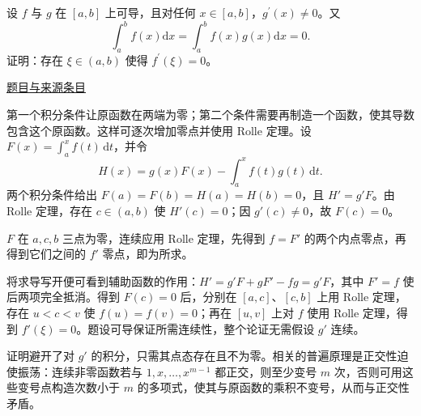 \documentclass[UTF8,12pt,a4paper,fontset=fandol]{ctexart}
\begin{document}
\begin{example}[来源序号5]\label{ex:ch06-14th-A-makeup2:5}\label{pr:ch06-14th-A-makeup2:5}

设 $f$ 与 $g$ 在 $[a,b]$ 上可导，且对任何 $x\in[a,b]$，$g^{\prime}(x)\neq 0$。又
\[
\int_{a}^{b}f(x)\mathrm{d}x=\int_{a}^{b}f(x)g(x)\mathrm{d}x=0.
\]
证明：存在 $\xi\in(a,b)$ 使得 $f^{\prime}(\xi)=0$。

\par\href{https://github.com/lzxcr/cmc-mathematics/blob/64916fa1fdbc3e444a652eca204d5669058ee321/src/problems/preliminary/14-makeup2/05.md}{题目与来源条目}

\end{example}

\begin{solve}\label{ans:ch06-14th-A-makeup2:5}

第一个积分条件让原函数在两端为零；第二个条件需要再制造一个函数，使其导数包含这个原函数。这样可逐次增加零点并使用 Rolle 定理。设 $F(x)=\int_a^x f(t)\,\mathrm dt$，并令
\[
H(x)=g(x)F(x)-\int_a^x f(t)g(t)\,\mathrm dt.
\]
两个积分条件给出 $F(a)=F(b)=H(a)=H(b)=0$，且 $H'=g'F$。由 Rolle 定理，存在 $c\in(a,b)$ 使 $H'(c)=0$；因 $g'(c)\neq0$，故 $F(c)=0$。

$F$ 在 $a,c,b$ 三点为零，连续应用 Rolle 定理，先得到 $f=F'$ 的两个内点零点，再得到它们之间的 $f'$ 零点，即为所求。

将求导写开便可看到辅助函数的作用：$H'=g'F+gF'-fg=g'F$，其中 $F'=f$ 使后两项完全抵消。得到 $F(c)=0$ 后，分别在 $[a,c]$、$[c,b]$ 上用 Rolle 定理，存在 $u<c<v$ 使 $f(u)=f(v)=0$；再在 $[u,v]$ 上对 $f$ 使用 Rolle 定理，得到 $f'(\xi)=0$。题设可导保证所需连续性，整个论证无需假设 $g'$ 连续。

\end{solve}

\begin{remark}[方法与条件]证明避开了对 $g'$ 的积分，只需其点态存在且不为零。相关的普遍原理是正交性迫使振荡：连续非零函数若与 $1,x,\ldots,x^{m-1}$ 都正交，则至少变号 $m$ 次，否则可用这些变号点构造次数小于 $m$ 的多项式，使其与原函数的乘积不变号，从而与正交性矛盾。\end{remark}
\end{document}
